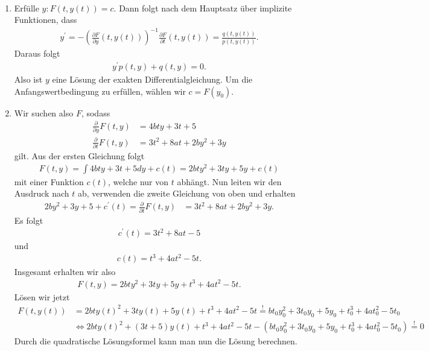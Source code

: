 \begin{solution}
  \phantom{}
\leavevmode \\
\begin{enumerate}[label = \textbf{\alph*)}]
\item Erfülle $y: F(t,y(t)) = c$. Dann folgt nach dem Hauptsatz über implizite
Funktionen, dass
\begin{align*}
  y^{\prime} = -\left(\frac{\partial F}{\partial y}(t,y(t))\right)^{-1}
  \frac{\partial F}{\partial t}(t,y(t)) = \frac{q(t,y(t))}{p(t,y(t))}.
\end{align*}
Daraus folgt
\begin{align*}
  y^{\prime}p(t,y) + q(t,y) = 0.
\end{align*}
Also ist $y$ eine Lösung der exakten Differentialgleichung. Um die Anfangswertbedingung
zu erfüllen, wählen wir $c = F(y_0)$.
\item Wir suchen also $F$, sodass
\begin{align*}
  \frac{\partial}{\partial y}F(t,y) &= 4bty + 3t + 5 \\
  \frac{\partial}{\partial t}F(t,y) &= 3t^2 + 8at + 2by^2 + 3y
\end{align*}
gilt. Aus der ersten Gleichung folgt
\begin{align*}
  F(t,y) = \int 4bty + 3t + 5 dy + c(t) = 2bty^2 + 3ty + 5y + c(t)
\end{align*}
mit einer Funktion $c(t)$, welche nur von $t$ abhängt.
Nun leiten wir den Ausdruck nach $t$ ab, verwenden die zweite Gleichung von oben
und erhalten
\begin{align*}
  2by^2 + 3y + 5 + c^{\prime}(t) = \frac{\partial}{\partial t}F(t,y) &= 3t^2 + 8at + 2by^2 + 3y.
\end{align*}
Es folgt
\begin{align*}
  c^{\prime}(t) = 3t^2 + 8at - 5
\end{align*}
und
\begin{align*}
  c(t) = t^3 + 4at^2 - 5t.
\end{align*}
Insgesamt erhalten wir also
\begin{align*}
  F(t,y) = 2bty^2 + 3ty + 5y + t^3 + 4at^2 - 5t.
\end{align*}
Lösen wir jetzt
\begin{align*}
  F(t,y(t)) &= 2bty(t)^2 + 3ty(t) + 5y(t) + t^3 + 4at^2 - 5t \stackrel{!}{=}
  bt_0y_0^2 + 3t_0y_0 + 5y_0 + t_0^3 + 4at_0^2 - 5t_0\\
  &\iff 2bty(t)^2 + (3t + 5)y(t) + t^3 + 4at^2 - 5t -
  (bt_0y_0^2 + 3t_0y_0 + 5y_0 + t_0^3 + 4at_0^2 - 5t_0) \stackrel{!}{=} 0
\end{align*}
Durch die quadratische Lösungsformel kann man nun die Lösung berechnen.
\end{enumerate}
\end{solution}
